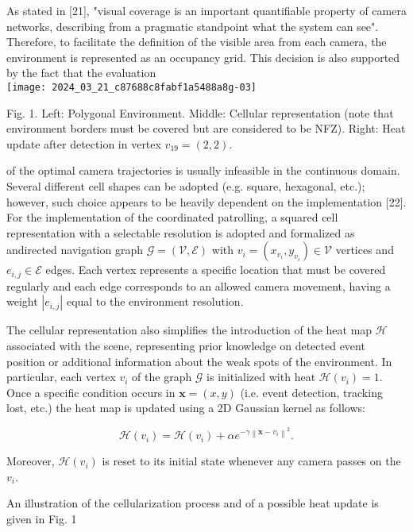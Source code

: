 \documentclass[conference]{IEEEtran}
\begin{document}
As stated in [21], "visual coverage is an important quantifiable property of camera networks, describing from a pragmatic standpoint what the system can see". Therefore, to facilitate the definition of the visible area from each camera, the environment is represented as an occupancy grid. This decision is also supported by the fact that the evaluation\\
\texttt{[image: 2024\_03\_21\_c87688c8fabf1a5488a8g-03]}

Fig. 1. Left: Polygonal Environment. Middle: Cellular representation (note that environment borders must be covered but are considered to be NFZ). Right: Heat update after detection in vertex $v_{19}=(2,2)$.

of the optimal camera trajectories is usually infeasible in the continuous domain. Several different cell shapes can be adopted (e.g. square, hexagonal, etc.); however, such choice appears to be heavily dependent on the implementation [22]. For the implementation of the coordinated patrolling, a squared cell representation with a selectable resolution is adopted and formalized as andirected navigation graph $\mathcal{G}=(\mathcal{V}, \mathcal{E})$ with $v_{i}=\left(x_{v_{i}}, y_{v_{i}}\right) \in \mathcal{V}$ vertices and $e_{i, j} \in \mathcal{E}$ edges. Each vertex represents a specific location that must be covered regularly and each edge corresponds to an allowed camera movement, having a weight $\left|e_{i, j}\right|$ equal to the environment resolution.

The cellular representation also simplifies the introduction of the heat map $\mathcal{H}$ associated with the scene, representing prior knowledge on detected event position or additional information about the weak spots of the environment. In particular, each vertex $v_{i}$ of the graph $\mathcal{G}$ is initialized with heat $\mathcal{H}\left(v_{i}\right)=1$. Once a specific condition occurs in $\mathbf{x}=(x, y)$ (i.e. event detection, tracking lost, etc.) the heat map is updated using a 2D Gaussian kernel as follows:


\begin{equation*}
\mathcal{H}\left(v_{i}\right)=\mathcal{H}\left(v_{i}\right)+\alpha e^{-\gamma\left\|\mathbf{x}-v_{i}\right\|^{2}} . \tag{1}
\end{equation*}


Moreover, $\mathcal{H}\left(v_{i}\right)$ is reset to its initial state whenever any camera passes on the $v_{i}$.

An illustration of the cellularization process and of a possible heat update is given in Fig. 1
\end{document}
